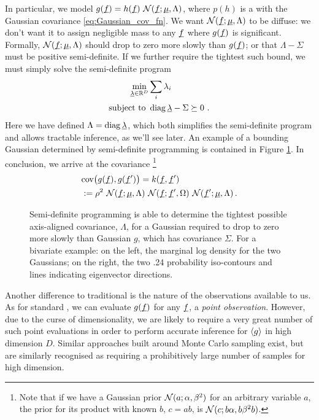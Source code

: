 \documentclass[twoside]{article}
\begin{document}
In particular, we model $g(\underline{\smash{f}}) = h(\underline{\smash{f}})~\mathcal{N}(\underline{\smash{f}};\underline{\smash{\mu}},\Lambda)$, where $p(h)$ is a \gp with the Gaussian covariance \eqref{eq:Gaussian_cov_fn}. We want $\mathcal{N}(\underline{\smash{f}};\underline{\smash{\mu}},\Lambda)$ to be diffuse: we don't want it to assign negligible mass to any $\underline{\smash{f}}$ where $g(\underline{\smash{f}})$ is significant. Formally, $\mathcal{N}(\underline{\smash{f}};\underline{\smash{\mu}},\Lambda)$ should drop to zero more slowly than $g(\underline{\smash{f}})$; or that $\Lambda - \Sigma$ must be positive semi-definite. If we further require the tightest such bound, we must simply solve the semi-definite program
\begin{align}
 \min_{\underline{\smash{\lambda}}\in\mathbb{R}^D} & \sum_i \lambda_i\\
\text{subject to } & \operatorname{diag}{\underline{\smash{\lambda}}} - \Sigma \succeq 0~.
\end{align}
Here we have defined $\Lambda = \operatorname{diag} \underline{\smash{\lambda}}$, which both simplifies the semi-definite program and allows tractable inference, as we'll see later. An example of a bounding Gaussian determined by semi-definite programming is contained in Figure \ref{fig:bounding_ellipse}. In conclusion, we arrive at the covariance%
\footnote{Note that if we have a Gaussian prior $\mathcal{N}(a;\alpha,\beta^2)$ for an arbitrary variable $a$, the prior for its product with known $b$, $c = a b$, is $\mathcal{N}(c;b \alpha,b \beta^2 b)$.}
\begin{align} \label{eq:g_cov}
 & \text{cov}\bigl(g(\underline{\smash{f}}), g(\underline{\smash{f}}')\bigr) = k(\underline{\smash{f}}, \underline{\smash{f}}')\nonumber\\ & := \rho^2~\mathcal{N}(\underline{\smash{f}};\underline{\smash{\mu}},\Lambda)~\mathcal{N}(\underline{\smash{f}};\underline{\smash{f}}',\Omega)~\mathcal{N}(\underline{\smash{f}}';\underline{\smash{\mu}},\Lambda)\,.
\end{align}

\begin{figure}
\caption{Semi-definite programming is able to determine the tightest possible axis-aligned covariance, $\Lambda$, for a Gaussian required to drop to zero more slowly than Gaussian $g$, which has covariance $\Sigma$. For a bivariate example: on the left, the marginal log density for the two Gaussians; on the right, the two .24 probability iso-contours and lines indicating eigenvector directions.}
\label{fig:bounding_ellipse}
\end{figure}

Another difference to traditional  is the nature of the observations available to us. As for standard , we can evaluate $g(\underline{\smash{f}})$ for any $\underline{\smash{f}}$, a \emph{point observation}. However, due to the curse of dimensionality, we are likely to require a very great number of such point evaluations in order to perform accurate inference for $\langle g \rangle$ in high dimension $D$. Similar approaches built around Monte Carlo sampling \citep{genz1992numerical} exist, but are similarly recognised as requiring a prohibitively large number of samples for high dimension. 
\end{document}
